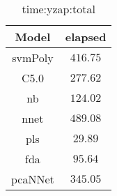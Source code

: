 \begin{table}[!ht]
	\centering
	\begin{tabular}{|c|c|}
		\hline
		Model & elapsed \\ \hline
		svmPoly & $416.75$ \\ \hline
		C5.0 & $277.62$ \\ \hline
		nb & $124.02$ \\ \hline
		nnet & $489.08$ \\ \hline
		pls & $29.89$ \\ \hline
		fda & $95.64$ \\ \hline
		pcaNNet & $345.05$ \\ \hline
	\end{tabular}
	\caption{time:yzap:total}
	\label{tab:time:yzap:total}
\end{table}
